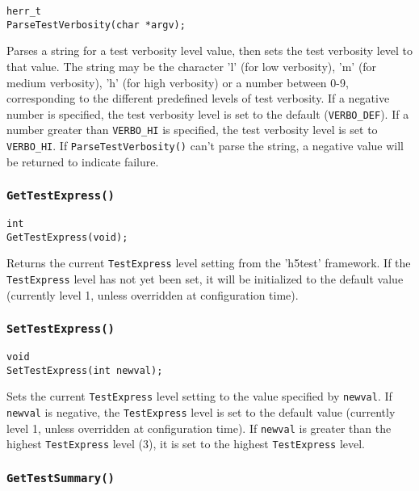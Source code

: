 \documentclass[../HDF5_RFC.tex]{subfiles}
\begin{document}
\begin{verbatim}
herr_t
ParseTestVerbosity(char *argv);
\end{verbatim}

Parses a string for a test verbosity level value, then sets the test verbosity level to that value.
The string may be the character 'l' (for low verbosity), 'm' (for medium verbosity), 'h' (for high verbosity)
or a number between 0-9, corresponding to the different predefined levels of test verbosity. If a negative
number is specified, the test verbosity level is set to the default (\texttt{VERBO\_DEF}). If a number
greater than \texttt{VERBO\_HI} is specified, the test verbosity level is set to \texttt{VERBO\_HI}. If \texttt{ParseTestVerbosity()} can't parse the string, a negative value will be returned to indicate
failure.

\subsubsection{\texttt{GetTestExpress()}}
\label{apdx:testframe_gettestexpress}

\begin{verbatim}
int
GetTestExpress(void);
\end{verbatim}

Returns the current \texttt{TestExpress} level setting from the 'h5test' framework. If the
\texttt{TestExpress} level has not yet been set, it will be initialized to the default value
(currently level 1, unless overridden at configuration time).

\subsubsection{\texttt{SetTestExpress()}}

\begin{verbatim}
void
SetTestExpress(int newval);
\end{verbatim}

Sets the current \texttt{TestExpress} level setting to the value specified by \texttt{newval}. If \texttt{newval} is negative, the \texttt{TestExpress} level is set to the default value (currently
level 1, unless overridden at configuration time). If \texttt{newval} is greater than the highest
\texttt{TestExpress} level (3), it is set to the highest \texttt{TestExpress} level.

\subsubsection{\texttt{GetTestSummary()}}
\end{document}
